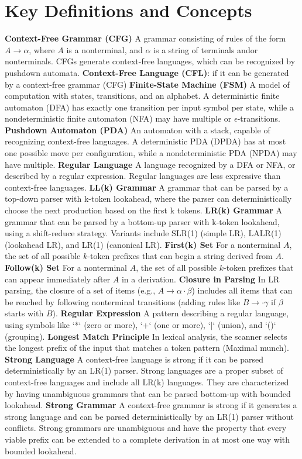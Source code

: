 
\section{Key Definitions and Concepts}
\textbf{Context-Free Grammar (CFG)} A grammar consisting of rules of the form $A \rightarrow \alpha $, where $A$ is a nonterminal, and $\alpha $ is a string of terminals and\/or nonterminals. CFGs generate context-free languages, which can be recognized by pushdown automata.
\textbf{Context-Free Language (CFL)}: if it can be generated by a context-free grammar (CFG)
\textbf{Finite-State Machine (FSM)} A model of computation with states, transitions, and an alphabet. A deterministic finite automaton (DFA) has exactly one transition per input symbol per state, while a nondeterministic finite automaton (NFA) may have multiple or $\epsilon$-transitions.
\textbf{Pushdown Automaton (PDA)} An automaton with a stack, capable of recognizing context-free languages. A deterministic PDA (DPDA) has at most one possible move per configuration, while a nondeterministic PDA (NPDA) may have multiple.
\textbf{Regular Language} A language recognized by a DFA or NFA, or described by a regular expression. Regular languages are less expressive than context-free languages.
\textbf{LL(k) Grammar} A grammar that can be parsed by a top-down parser with k-token lookahead, where the parser can deterministically choose the next production based on the first k tokens.
\textbf{LR(k) Grammar} A grammar that can be parsed by a bottom-up parser with k-token lookahead, using a shift-reduce strategy. Variants include SLR(1) (simple LR), LALR(1) (lookahead LR), and LR(1) (canonical LR).
\textbf{First(k) Set} For a nonterminal $A$, the set of all possible $k$-token prefixes that can begin a string derived from $A$.
\textbf{Follow(k) Set} For a nonterminal $A$, the set of all possible $k$-token prefixes that can appear immediately after $A$ in a derivation.
\textbf{Closure in Parsing} In LR parsing, the closure of a set of items (e.g., $A \rightarrow \alpha \cdot \beta $) includes all items that can be reached by following nonterminal transitions (adding rules like $B \rightarrow \cdot \gamma$ if $\beta $ starts with $B$).
\textbf{Regular Expression} A pattern describing a regular language, using symbols like `*` (zero or more), `+` (one or more), `$\vert$` (union), and `()` (grouping).
\textbf{Longest Match Principle} In lexical analysis, the scanner selects the longest prefix of the input that matches a token pattern (Maximal munch).
\textbf{Strong Language} A context-free language is strong if it can be parsed deterministically by an LR(1) parser. Strong languages are a proper subset of context-free languages and include all LR(k) languages. They are characterized by having unambiguous grammars that can be parsed bottom-up with bounded lookahead.
\textbf{Strong Grammar} A context-free grammar is strong if it generates a strong language and can be parsed deterministically by an LR(1) parser without conflicts. Strong grammars are unambiguous and have the property that every viable prefix can be extended to a complete derivation in at most one way with bounded lookahead.
